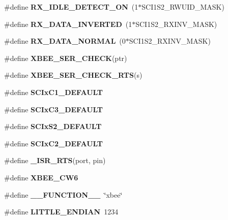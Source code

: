 \begin{DoxyCompactItemize}
\item 
\hypertarget{group__hal__hcs08_gaabfee037722f85499aeb6d652c2dcab5}{\#define {\bfseries R\-X\-\_\-\-I\-D\-L\-E\-\_\-\-D\-E\-T\-E\-C\-T\-\_\-\-O\-N}~(1$\ast$S\-C\-I1\-S2\-\_\-\-R\-W\-U\-I\-D\-\_\-\-M\-A\-S\-K)}\label{group__hal__hcs08_gaabfee037722f85499aeb6d652c2dcab5}

\item 
\hypertarget{group__hal__hcs08_gab7b998b86a088f5061781736b60cb887}{\#define {\bfseries R\-X\-\_\-\-D\-A\-T\-A\-\_\-\-I\-N\-V\-E\-R\-T\-E\-D}~(1$\ast$S\-C\-I1\-S2\-\_\-\-R\-X\-I\-N\-V\-\_\-\-M\-A\-S\-K)}\label{group__hal__hcs08_gab7b998b86a088f5061781736b60cb887}

\item 
\hypertarget{group__hal__hcs08_ga0a72a4916f2154d228a89ef2cf511758}{\#define {\bfseries R\-X\-\_\-\-D\-A\-T\-A\-\_\-\-N\-O\-R\-M\-A\-L}~(0$\ast$S\-C\-I1\-S2\-\_\-\-R\-X\-I\-N\-V\-\_\-\-M\-A\-S\-K)}\label{group__hal__hcs08_ga0a72a4916f2154d228a89ef2cf511758}

\item 
\hypertarget{group__hal__hcs08_ga755b7e850db6200a6f43b741c678ae53}{\#define {\bfseries X\-B\-E\-E\-\_\-\-S\-E\-R\-\_\-\-C\-H\-E\-C\-K}(ptr)}\label{group__hal__hcs08_ga755b7e850db6200a6f43b741c678ae53}

\item 
\#define {\bfseries X\-B\-E\-E\-\_\-\-S\-E\-R\-\_\-\-C\-H\-E\-C\-K\-\_\-\-R\-T\-S}(s)
\item 
\#define {\bfseries S\-C\-Ix\-C1\-\_\-\-D\-E\-F\-A\-U\-L\-T}
\item 
\#define {\bfseries S\-C\-Ix\-C3\-\_\-\-D\-E\-F\-A\-U\-L\-T}
\item 
\#define {\bfseries S\-C\-Ix\-S2\-\_\-\-D\-E\-F\-A\-U\-L\-T}
\item 
\#define {\bfseries S\-C\-Ix\-C2\-\_\-\-D\-E\-F\-A\-U\-L\-T}
\item 
\#define {\bfseries \-\_\-\-I\-S\-R\-\_\-\-R\-T\-S}(port, pin)
\item 
\hypertarget{group__hal__hcs08_ga760ceea16e88c6f4195e368ebbdff7bc}{\#define {\bfseries X\-B\-E\-E\-\_\-\-C\-W6}}\label{group__hal__hcs08_ga760ceea16e88c6f4195e368ebbdff7bc}

\item 
\hypertarget{group__hal__hcs08_ga828bb1dfda1afd67ca795075903d227d}{\#define {\bfseries \-\_\-\-\_\-\-F\-U\-N\-C\-T\-I\-O\-N\-\_\-\-\_\-}~\char`\"{}xbee\char`\"{}}\label{group__hal__hcs08_ga828bb1dfda1afd67ca795075903d227d}

\item 
\hypertarget{group__hal__hcs08_ga8782a401fbf55261460863fc2f8df1ce}{\#define {\bfseries L\-I\-T\-T\-L\-E\-\_\-\-E\-N\-D\-I\-A\-N}~1234}\label{group__hal__hcs08_ga8782a401fbf55261460863fc2f8df1ce}


\end{DoxyCompactItemize}
